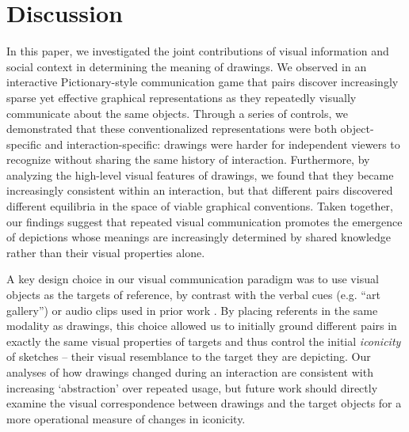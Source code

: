 \documentclass[10pt,letterpaper]{article}
\begin{document}
\section{Discussion}

In this paper, we investigated the joint contributions of visual information and social context in determining the meaning of drawings.
We observed in an interactive Pictionary-style communication game that pairs discover increasingly sparse yet effective graphical representations as they repeatedly visually communicate about the same objects.
Through a series of controls, we demonstrated that these conventionalized representations were both object-specific and interaction-specific: drawings were harder for independent viewers to recognize without sharing the same history of interaction.
Furthermore, by analyzing the high-level visual features of drawings, we found that they became increasingly consistent within an interaction, but that different pairs discovered different equilibria in the space of viable graphical conventions.
Taken together, our findings suggest that repeated visual communication promotes the emergence of depictions whose meanings are increasingly determined by shared knowledge rather than their visual properties alone.

A key design choice in our visual communication paradigm was to use visual objects as the targets of reference, by contrast with the verbal cues (e.g. ``art gallery'') or audio clips used in prior work \cite{GalantucciGarrod11_ExperimentalSemiotics}. %
By placing referents in the same modality as drawings, this choice allowed us to initially ground different pairs in exactly the same visual properties of targets and thus control the initial \emph{iconicity} of sketches -- their visual resemblance to the target they are depicting.
Our analyses of how drawings changed during an interaction are consistent with increasing ‘abstraction’ over repeated usage, but future work should directly examine the visual correspondence between drawings and the target objects for a more operational measure of changes in iconicity.
\end{document}
